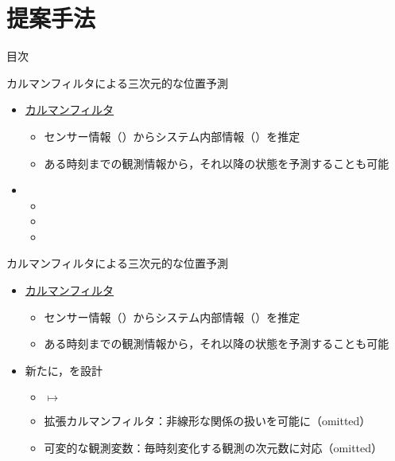 \section{提案手法}

\begin{frame}[noframenumbering]{目次}
    \tableofcontents[currentsection]
\end{frame}

\begin{frame}{カルマンフィルタによる三次元的な位置予測}
    \begin{itemize}
        \item \uline{カルマンフィルタ} \cite{bishop2001introduction}
        \begin{itemize}
            \item センサー情報（）からシステム内部情報（）を推定
            \item ある時刻までの観測情報から，それ以降の状態を予測することも可能
        \end{itemize}
        \item[\phantom{}] 
        \begin{itemize}
            \item[\phantom{}] 
            \item[\phantom{}] \phantom{拡張カルマンフィルタ：非線形な関係の扱いを可能に（omitted）}
            \item[\phantom{}] \phantom{可変的な観測変数：毎時刻変化する観測の次元数に対応（omitted）}
        \end{itemize}
    \end{itemize}
\end{frame}
\begin{frame}[noframenumbering]{カルマンフィルタによる三次元的な位置予測}
    \begin{itemize}
        \item \uline{カルマンフィルタ} \cite{bishop2001introduction}
        \begin{itemize}
            \item センサー情報（）からシステム内部情報（）を推定
            \item ある時刻までの観測情報から，それ以降の状態を予測することも可能
        \end{itemize}
        \item 新たに，を設計
        \begin{itemize}
            \item {} $\mapsto$ 
            \item 拡張カルマンフィルタ：非線形な関係の扱いを可能に（omitted）
            \item 可変的な観測変数：毎時刻変化する観測の次元数に対応（omitted）
        \end{itemize}
    \end{itemize}
\end{frame}

